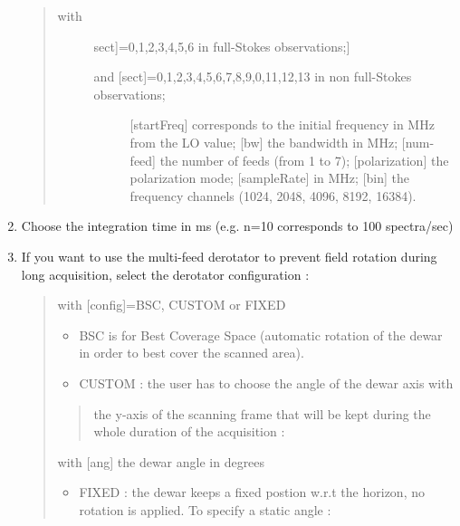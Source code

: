 \documentclass[letterpaper,10pt,english]{sphinxmanual}
\begin{document}
\begin{enumerate}
\begin{quote}
\begin{description}
\item[{with}] \leavevmode{[}{[}sect{]}=0,1,2,3,4,5,6 in full-Stokes observations;{]}\begin{description}
\item[{and {[}sect{]}=0,1,2,3,4,5,6,7,8,9,0,11,12,13 in non full-Stokes observations;}] \leavevmode
{[}startFreq{]} corresponds to the initial frequency in MHz from the LO value;
{[}bw{]} the bandwidth in MHz;
{[}num-feed{]} the number of feeds (from 1 to 7);
{[}polarization{]} the polarization mode;
{[}sampleRate{]} in MHz;
{[}bin{]} the frequency channels (1024, 2048, 4096, 8192, 16384).

\end{description}

\end{description}
\end{quote}

\item {} 
Choose the integration time in ms (e.g. n=10 corresponds to 100 spectra/sec)


\item {} 
If you want to use the multi-feed derotator to prevent field rotation during long acquisition, select the derotator configuration :
\begin{quote}

   with {[}config{]}=BSC, CUSTOM or FIXED
\begin{itemize}
\item {} 
BSC is for Best Coverage Space (automatic rotation of the dewar in order to best cover the scanned area).

\item {} 
CUSTOM : the user has to choose the angle of the dewar axis with

\end{itemize}
\begin{quote}

the y-axis of the scanning frame that will be kept during the
whole duration of the acquisition :
\end{quote}

     with {[}ang{]} the dewar angle in degrees
\begin{itemize}
\item {} 
FIXED : the dewar keeps a fixed postion w.r.t the horizon, no rotation is applied. To specify a static angle :


\end{itemize}
\end{quote}
\end{enumerate}
\end{document}
